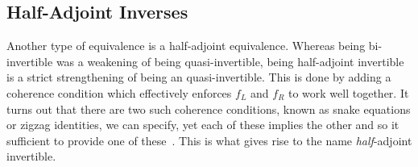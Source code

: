 \documentclass[draft]{article}
\begin{document}
\subsection{Half-Adjoint Inverses}\label{sec:hai}

Another type of equivalence is a half-adjoint equivalence. Whereas
being bi-invertible was a weakening of being quasi-invertible, being
half-adjoint invertible is a strict strengthening of being an
quasi-invertible. This is done by adding a coherence condition which
effectively enforces \(f_L\) and \(f_R\) to work well together. It
turns out that there are two such coherence conditions, known as snake equations or zigzag identities, we can specify,
yet each of these implies the other and so it sufficient to provide
one of these~\cite[Lemma 3.2]{nlab:adjoint_equivalence}. This
is what gives rise to the name \emph{half}-adjoint invertible.
\end{document}
